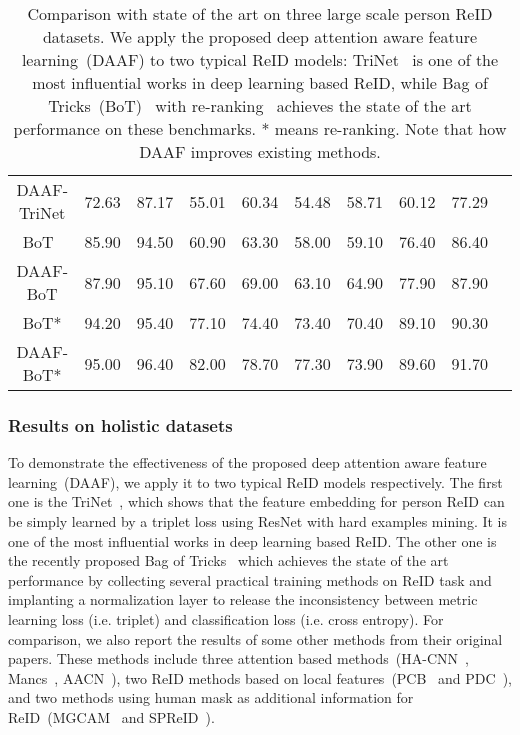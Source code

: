\documentclass[10pt,twocolumn,letterpaper]{article}
\begin{document}
\begin{table*}[t]
\begin{center}
{\begin{tabular}{c|ccccccccc}
				DAAF-TriNet
				& 72.63 & 87.17  & 55.01  & 60.34  & 54.48  & 58.71  & 60.12 & 77.29 \\
				
				BoT~\cite{luo2019bag}
				& 85.90  & 94.50  & 60.90 & 63.30 & 58.00 & 59.10 & 76.40  & 86.40 \\
				
				DAAF-BoT 	& 87.90  & 95.10  & 67.60  & 69.00  & 63.10  & 64.90  & 77.90  & 87.90 \\
				
				BoT*
				& 94.20  & 95.40  & 77.10 & 74.40 & 73.40 & 70.40 & 89.10  & 90.30 \\
				
				DAAF-BoT*
				& 95.00  & 96.40  & 82.00  & 78.70  & 77.30  & 73.90  & 89.60  & 91.70 \bigstrut[b]\\
				
				\hline
			\end{tabular}	
		}
	\end{center}
	\caption{Comparison with state of the art on three large scale person ReID datasets. We apply the proposed deep attention aware feature learning~(DAAF) to two typical ReID models: TriNet~\cite{hermans2017defense} is one of the most influential works in deep learning based ReID, while Bag of Tricks~(BoT)~\cite{luo2019bag} with re-ranking~\cite{zhong2017re} achieves the state of the art performance on these benchmarks. * means re-ranking. Note that how DAAF improves existing methods. } 
	\label{table:result}
	\footnotesize \end{table*}

\subsubsection{Results on holistic datasets}
To demonstrate the effectiveness of the proposed deep attention aware feature learning~(DAAF), we apply it to two typical ReID models respectively. The first one is the TriNet~\cite{hermans2017defense}, which shows that the feature embedding for person ReID can be simply learned by a triplet loss using ResNet with hard examples mining. It is one of the most influential works in deep learning based ReID. The other one is the recently proposed Bag of Tricks~\cite{luo2019bag} which achieves the state of the art performance by collecting several practical training methods on ReID task and implanting a normalization layer to release the inconsistency between metric learning loss (i.e. triplet) and classification loss (i.e. cross entropy).
For comparison, we also report the results of some other methods from their original papers. These methods include three attention based methods~(HA-CNN~\cite{li2018harmonious}, Mancs~\cite{wang2018mancs}, AACN~\cite{xu2018attention}), two ReID methods based on local features~(PCB~\cite{li2018harmonious} and PDC~\cite{su2017pose}), and two methods  using human mask as additional information for ReID~(MGCAM~\cite{song2018mask} and SPReID~\cite{kalayeh2018human}). 
\end{document}
